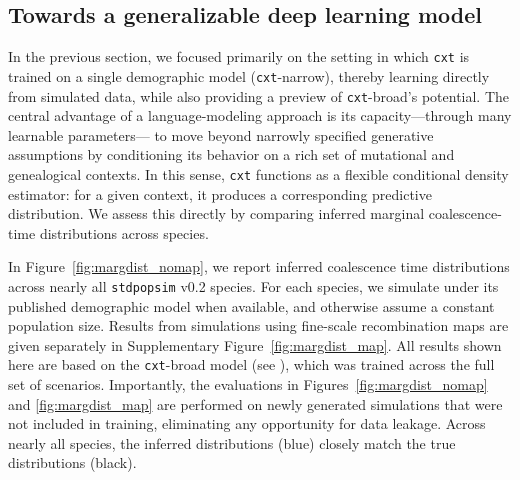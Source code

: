 \documentclass{article}
\newcommand{\cxtkit}{\texttt{cxt}\xspace}
\newcommand{\stdpopsim}{\texttt{stdpopsim}\xspace}
\begin{document}
\subsection*{Towards a generalizable deep learning model}
In the previous section, we focused primarily on the setting in which \cxtkit is trained on a single demographic model (\cxtkit-narrow), 
thereby learning directly from simulated data, while also providing a preview of \cxtkit-broad's potential.
The central advantage of a language-modeling approach is its capacity---through many learnable parameters---
to move beyond narrowly specified generative assumptions by conditioning its behavior 
on a rich set of mutational and genealogical contexts.
In this sense, \cxtkit functions as a flexible conditional density estimator: for a given context, it produces a corresponding predictive distribution. 
We assess this directly by comparing inferred marginal coalescence-time distributions across species.


In Figure~\ref{fig:margdist_nomap}, we report inferred coalescence time distributions across nearly all \stdpopsim v0.2 species. 
For each species, we simulate under its published demographic model when available, and otherwise assume a constant population size.
Results from simulations using fine-scale recombination maps are given separately in Supplementary Figure~\ref{fig:margdist_map}.
All results shown here are based on the \cxtkit-broad model (see ), which was trained across the full set of scenarios.
Importantly, the evaluations in Figures~\ref{fig:margdist_nomap} and \ref{fig:margdist_map} are performed on newly generated simulations
that were not included in training, eliminating any opportunity for data leakage. 
Across nearly all species, the inferred distributions (blue) closely match the true distributions (black).
\end{document}
